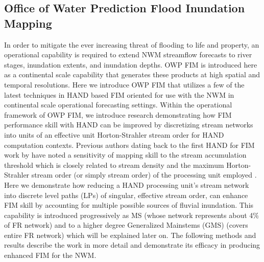 \documentclass[draft]{dependencies/agujournal2019}
\begin{document}
\subsection{Office of Water Prediction Flood Inundation Mapping}
%
In order to mitigate the ever increasing threat of flooding to life and property, an operational capability is required to extend NWM streamflow forecasts to river stages, inundation extents, and inundation depths.
OWP FIM is introduced here as a continental scale capability that generates these products at high spatial and temporal resolutions.
Here we introduce OWP FIM that utilizes a few of the latest techniques in HAND based FIM oriented for use with the NWM in continental scale operational forecasting settings. 
Within the operational framework of OWP FIM, we introduce research demonstrating how FIM performance skill with HAND can be improved by discretizing stream networks into units of an effective unit Horton-Strahler stream order \cite{horton1945erosional,strahler1952hypsometric,strahler1952hypsometric} for HAND computation contexts.
Previous authors dating back to the first HAND for FIM work by  have noted a sensitivity of mapping skill to the stream accumulation threshold which is closely related to stream density and the maximum Horton-Strahler stream order (or simply stream order) of the processing unit employed \cite{zhang2018comparative,mcgehee2016modified,li2020evaluation}.
Here we demonstrate how reducing a HAND processing unit's stream network into discrete level paths (LPs) of singular, effective stream order, can enhance FIM skill by accounting for multiple possible sources of fluvial inundation.
This capability is introduced progressively as MS (whose network represents about 4\% of FR network) and to a higher degree Generalized Mainstems (GMS) (covers entire FR network) which will be explained later on.
The following methods and results describe the work in more detail and demonstrate its efficacy in producing enhanced FIM for the NWM.
%
\clearpage %
\end{document}
